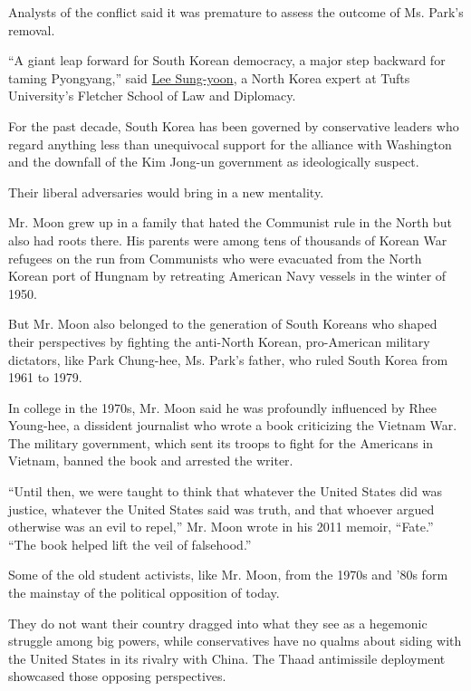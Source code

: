 Analysts of the conflict said it was premature to assess the outcome of
Ms. Park's removal.

``A giant leap forward for South Korean democracy, a major step backward
for taming Pyongyang,'' said
\href{http://fletcher.tufts.edu/Fletcher_Directory/Directory/Faculty\%20Profile?personkey=43424CD6-91DF-469E-83CC-E9DD75B6B913}{Lee
Sung-yoon}, a North Korea expert at Tufts University's Fletcher School
of Law and Diplomacy.

For the past decade, South Korea has been governed by conservative
leaders who regard anything less than unequivocal support for the
alliance with Washington and the downfall of the Kim Jong-un government
as ideologically suspect.

Their liberal adversaries would bring in a new mentality.

Mr. Moon grew up in a family that hated the Communist rule in the North
but also had roots there. His parents were among tens of thousands of
Korean War refugees on the run from Communists who were evacuated from
the North Korean port of Hungnam by retreating American Navy vessels in
the winter of 1950.

But Mr. Moon also belonged to the generation of South Koreans who shaped
their perspectives by fighting the anti-North Korean, pro-American
military dictators, like Park Chung-hee, Ms. Park's father, who ruled
South Korea from 1961 to 1979.

In college in the 1970s, Mr. Moon said he was profoundly influenced by
Rhee Young-hee, a dissident journalist who wrote a book criticizing the
Vietnam War. The military government, which sent its troops to fight for
the Americans in Vietnam, banned the book and arrested the writer.

``Until then, we were taught to think that whatever the United States
did was justice, whatever the United States said was truth, and that
whoever argued otherwise was an evil to repel,'' Mr. Moon wrote in his
2011 memoir, ``Fate.'' ``The book helped lift the veil of falsehood.''

Some of the old student activists, like Mr. Moon, from the 1970s and
'80s form the mainstay of the political opposition of today.

They do not want their country dragged into what they see as a hegemonic
struggle among big powers, while conservatives have no qualms about
siding with the United States in its rivalry with China. The Thaad
antimissile deployment showcased those opposing perspectives.

